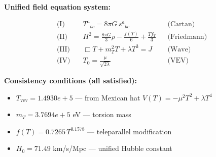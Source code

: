 
\textbf{Unified field equation system:}

\begin{align}
  \text{(I)} \quad & T^a{}_{bc} = 8\pi G \, s^a{}_{bc} && \text{(Cartan)} \\
  \text{(II)} \quad & H^2 = \frac{8\pi G}{3}\rho - \frac{f(T)}{6} + \frac{Tf_T}{3} && \text{(Friedmann)} \\
  \text{(III)} \quad & \Box T + m_T^2 T + \lambda T^3 = J && \text{(Wave)} \\
  \text{(IV)} \quad & T_0 = \frac{\mu}{\sqrt{2\lambda}} && \text{(VEV)}
\end{align}

\textbf{Consistency conditions (all satisfied):}
\begin{itemize}
  \item $T_{\text{vev}} = 1.4930e+5$ — from Mexican hat $V(T) = -\mu^2 T^2 + \lambda T^4$
  \item $m_T = 3.7694e+5$ eV — torsion mass
  \item $f(T) = 0.7265 \, T^{0.1578}$ — teleparallel modification
  \item $H_0 = 71.49$ km/s/Mpc — unified Hubble constant
\end{itemize}
